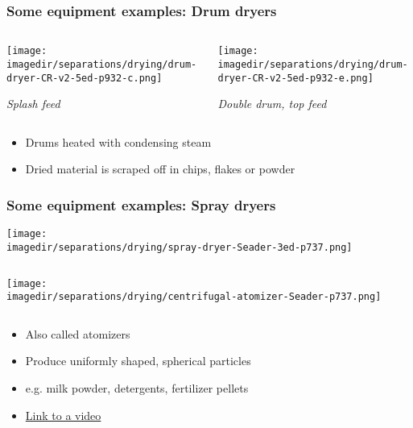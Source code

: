 \begin{frame}\frametitle{Some equipment examples: Drum dryers}
	\begin{columns}[b]
			\begin{center}
				\texttt{[image: \\imagedir/separations/drying/drum-dryer-CR-v2-5ed-p932-c.png]}

				\vspace{12pt}
				\emph{Splash feed}
			\end{center}


			\begin{center}
				\texttt{[image: \\imagedir/separations/drying/drum-dryer-CR-v2-5ed-p932-e.png]}

				\vspace{12pt}
				\emph{Double drum, top feed}
			\end{center}
	\end{columns}
	\begin{itemize}
		\item	Drums heated with condensing steam
		\item	Dried material is scraped off in chips, flakes or powder
	\end{itemize}
\end{frame}

\begin{frame}\frametitle{Some equipment examples: Spray dryers}
	\begin{center}
		\texttt{[image: \\imagedir/separations/drying/spray-dryer-Seader-3ed-p737.png]}
	\end{center}
	\vspace{-92pt}
	\begin{columns}[t]
			\begin{center}
				\texttt{[image: \\imagedir/separations/drying/centrifugal-atomizer-Seader-p737.png]}
			\end{center}
			\vspace{-12pt}
			\hfill{}
	\end{columns}
	\begin{itemize}
		\item	Also called atomizers
		\item	Produce uniformly shaped, spherical particles
		\item	e.g. milk powder, detergents, fertilizer pellets
		\item	\href{http://www.youtube.com/watch?v=u2LhmpDUjKk}{Link to a video}
	\end{itemize}
\end{frame}

